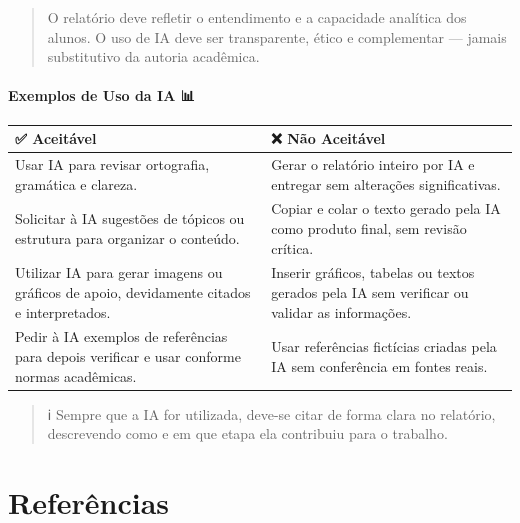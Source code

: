 \documentclass[
  a4paper,
]{book}
\newcommand{\emojitext}[1]{{\emoji #1}}
\begin{document}
\begin{quote}
O relatório deve refletir o entendimento e a capacidade analítica dos
alunos. O uso de IA deve ser transparente, ético e complementar ---
jamais substitutivo da autoria acadêmica.
\end{quote}

\subsubsection{Exemplos de Uso da IA 📊}\label{exemplos-de-uso-da-ia}

\begin{longtable}[]{@{}
  >{\raggedright\arraybackslash}p{}
  >{\raggedright\arraybackslash}p{}@{}}
\toprule\noalign{}
\begin{minipage}[b]{\linewidth}\raggedright
\emojitext{✅} Aceitável
\end{minipage} & \begin{minipage}[b]{\linewidth}\raggedright
\emojitext{❌} Não Aceitável
\end{minipage} \\
\midrule\noalign{}
\endhead
\bottomrule\noalign{}
\endlastfoot
Usar IA para revisar ortografia, gramática e clareza. & Gerar o
relatório inteiro por IA e entregar sem alterações significativas. \\
Solicitar à IA sugestões de tópicos ou estrutura para organizar o
conteúdo. & Copiar e colar o texto gerado pela IA como produto final,
sem revisão crítica. \\
Utilizar IA para gerar imagens ou gráficos de apoio, devidamente citados
e interpretados. & Inserir gráficos, tabelas ou textos gerados pela IA
sem verificar ou validar as informações. \\
Pedir à IA exemplos de referências para depois verificar e usar conforme
normas acadêmicas. & Usar referências fictícias criadas pela IA sem
conferência em fontes reais. \\
\end{longtable}

\begin{quote}
\emojitext{ℹ️} Sempre que a IA for utilizada, deve-se citar de forma
clara no relatório, descrevendo como e em que etapa ela contribuiu para
o trabalho.
\end{quote}


\chapter*{Referências}\label{referuxeancias}
\end{document}
